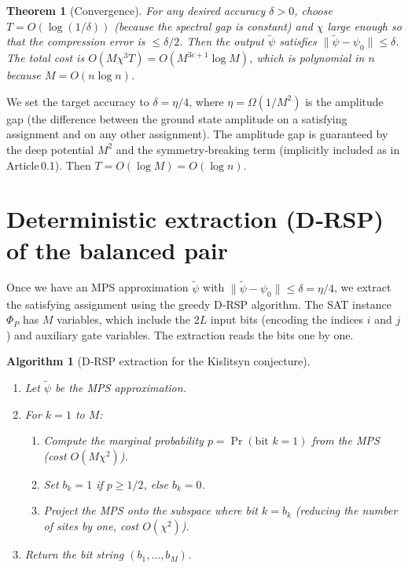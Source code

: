 \documentclass[11pt,a4paper]{article}
\newtheorem{theorem}{Theorem}[section]
\newtheorem{algorithm}{Algorithm}[section]
\begin{document}
\begin{theorem}[Convergence]\label{thm:power}
For any desired accuracy $\delta > 0$, choose $T = O(\log(1/\delta))$ (because the spectral gap is constant) and $\chi$ large enough so that the compression error is $\le \delta/2$. Then the output $\tilde{\psi}$ satisfies $\|\tilde{\psi} - \psi_0\| \le \delta$. The total cost is $O(M\chi^3 T) = O(M^{3c+1} \log M)$, which is polynomial in $n$ because $M = O(n \log n)$.
\end{theorem}

We set the target accuracy to $\delta = \eta/4$, where $\eta = \Omega(1/M^2)$ is the amplitude gap (the difference between the ground state amplitude on a satisfying assignment and on any other assignment). The amplitude gap is guaranteed by the deep potential $M^2$ and the symmetry‑breaking term (implicitly included as in Article 0.1). Then $T = O(\log M) = O(\log n)$.

\section{Deterministic extraction (D‑RSP) of the balanced pair}

Once we have an MPS approximation $\tilde{\psi}$ with $\|\tilde{\psi} - \psi_0\| \le \delta = \eta/4$, we extract the satisfying assignment using the greedy D‑RSP algorithm. The SAT instance $\Phi_P$ has $M$ variables, which include the $2L$ input bits (encoding the indices $i$ and $j$) and auxiliary gate variables. The extraction reads the bits one by one.

\begin{algorithm}[D‑RSP extraction for the Kislitsyn conjecture]\label{alg:drsp}
\begin{enumerate}
\item Let $\tilde{\psi}$ be the MPS approximation.
\item For $k = 1$ to $M$:
   \begin{enumerate}
   \item Compute the marginal probability $p = \Pr(\text{bit } k = 1)$ from the MPS (cost $O(M\chi^2)$).
   \item Set $b_k = 1$ if $p \ge 1/2$, else $b_k = 0$.
   \item Project the MPS onto the subspace where bit $k = b_k$ (reducing the number of sites by one, cost $O(\chi^2)$).
   \end{enumerate}
\item Return the bit string $(b_1,\dots,b_M)$.
\end{enumerate}
\end{algorithm}
\end{document}
